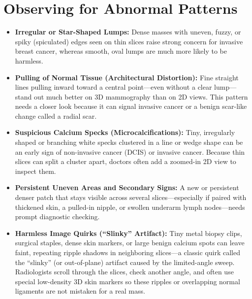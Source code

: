\section{Observing for Abnormal Patterns}
\begin{itemize}
\item \textbf{Irregular or Star-Shaped Lumps:} Dense masses with uneven, fuzzy, or spiky (spiculated) edges seen on thin slices raise strong concern for invasive breast cancer, whereas smooth, oval lumps are much more likely to be harmless.
\item \textbf{Pulling of Normal Tissue (Architectural Distortion):} Fine straight lines pulling inward toward a central point---even without a clear lump---stand out much better on 3D mammography than on 2D views. This pattern needs a closer look because it can signal invasive cancer or a benign scar-like change called a radial scar.
\item \textbf{Suspicious Calcium Specks (Microcalcifications):} Tiny, irregularly shaped or branching white specks clustered in a line or wedge shape can be an early sign of non-invasive cancer (DCIS) or invasive cancer. Because thin slices can split a cluster apart, doctors often add a zoomed-in 2D view to inspect them.
\item \textbf{Persistent Uneven Areas and Secondary Signs:} A new or persistent denser patch that stays visible across several slices---especially if paired with thickened skin, a pulled-in nipple, or swollen underarm lymph nodes---needs prompt diagnostic checking.
\item \textbf{Harmless Image Quirks (``Slinky'' Artifact):} Tiny metal biopsy clips, surgical staples, dense skin markers, or large benign calcium spots can leave faint, repeating ripple shadows in neighboring slices---a classic quirk called the ``slinky'' (or out-of-plane) artifact caused by the limited-angle sweep. Radiologists scroll through the slices, check another angle, and often use special low-density 3D skin markers so these ripples or overlapping normal ligaments are not mistaken for a real mass.
\end{itemize}

